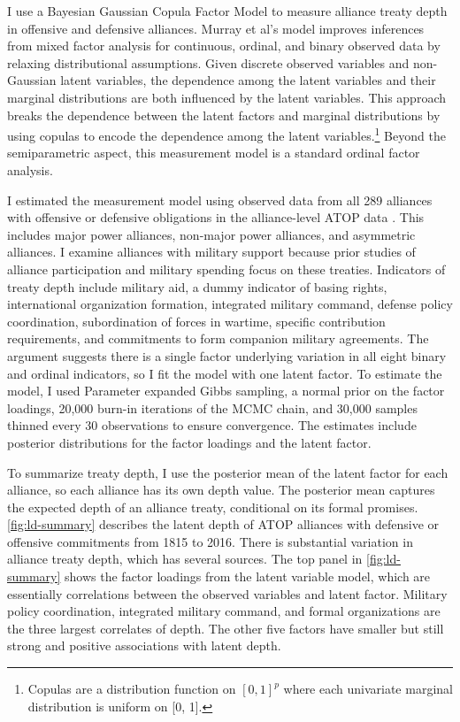 \documentclass[12pt]{article}
\begin{document}
I use a Bayesian Gaussian Copula Factor Model \citep{Murrayetal2013} to measure alliance treaty depth in offensive and defensive alliances. 
Murray et al's model improves inferences from mixed factor analysis for continuous, ordinal, and binary observed data by relaxing distributional assumptions.
Given discrete observed variables and non-Gaussian latent variables, the dependence among the latent variables and their marginal distributions are both influenced by the latent variables.
This approach breaks the dependence between the latent factors and marginal distributions by using copulas to encode the dependence among the latent variables.\footnote{Copulas are a distribution function on $[0, 1]^p$ where each univariate marginal distribution is uniform on [0, 1].}
Beyond the semiparametric aspect, this measurement model is a standard ordinal factor analysis.


I estimated the measurement model using observed data from all 289 alliances with offensive or defensive obligations in the alliance-level ATOP data \citep{Leedsetal2002}. 
This includes major power alliances, non-major power alliances, and asymmetric alliances. 
I examine alliances with military support because prior studies of alliance participation and military spending focus on these treaties.
Indicators of treaty depth include military aid, a dummy indicator of basing rights, international organization formation, integrated military command, defense policy coordination, subordination of forces in wartime, specific contribution requirements, and commitments to form companion military agreements.
The argument suggests there is a single factor underlying variation in all eight binary and ordinal indicators, so I fit the model with one latent factor. 
To estimate the model, I used Parameter expanded Gibbs sampling, a normal prior on the factor loadings, 20,000 burn-in iterations of the MCMC chain, and 30,000 samples thinned every 30 observations to ensure convergence. 
The estimates include posterior distributions for the factor loadings and the latent factor. 


To summarize treaty depth, I use the posterior mean of the latent factor for each alliance, so each alliance has its own depth value.
The posterior mean captures the expected depth of an alliance treaty, conditional on its formal promises. 
\autoref{fig:ld-summary} describes the latent depth of ATOP alliances with defensive or offensive commitments from 1815 to 2016.
There is substantial variation in alliance treaty depth, which has several sources. 
The top panel in \autoref{fig:ld-summary} shows the factor loadings from the latent variable model, which are essentially correlations between the observed variables and latent factor. 
Military policy coordination, integrated military command, and formal organizations are the three largest correlates of depth. 
The other five factors have smaller but still strong and positive associations with latent depth. 
\end{document}
